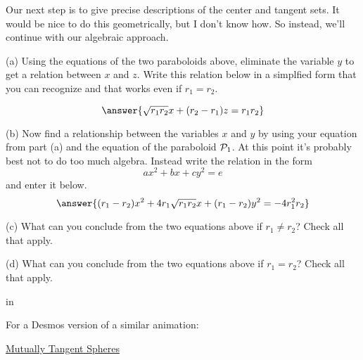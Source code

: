 \documentclass{ximera}
\newcommand{\pskip}{\vskip 0.1 in}
\begin{document}
\begin{question} \label{Q5r43rd:Spheres}

Our next step is to give precise descriptions of the center and tangent sets. It would be nice to do this geometrically, but I don't know how. So instead, we'll continue with our algebraic approach.

(a) Using the equations of the two paraboloids above, eliminate the variable $y$ to get a relation between $x$ and $z$. Write this relation below in a simplfied form that you can recognize and that works even if $r_1 = r_2$.

\[
    \answer{\sqrt{r_1 r_2}x + (r_2 - r_1) z = r_1 r_2}
\]

(b) Now find a relationship between the variables $x$ and $y$ by using your equation from part (a) and the equation of the paraboloid ${\cal P}_1$. At this point it's probably best not to do too much algebra. Instead write the relation in the form 
\[
   ax^2 + bx + cy^2 = e 
\]
and enter it below.
\[
    \answer{(r_1 - r_2)x^2 + 4 r_1\sqrt{r_1r_2}x + (r_1-r_2)y^2 = - 4r_1^2 r_2}
\]

(c) What can you conclude from the two equations above if $r_1\neq r_2$? Check all that apply.
 \begin{selectAll}  
  \end{selectAll}  

(d) What can you conclude from the two equations above if $r_1= r_2$? Check all that apply.
 \begin{selectAll}  
  \end{selectAll}



 
\begin{onlineOnly}
    \begin{center}
\end{center}
\end{onlineOnly}


\end{question}


\pskip
 
For a Desmos version of a similar animation:

\href{https://www.desmos.com/3d/7fb88aea41}{Mutually Tangent Spheres}
\end{document}
